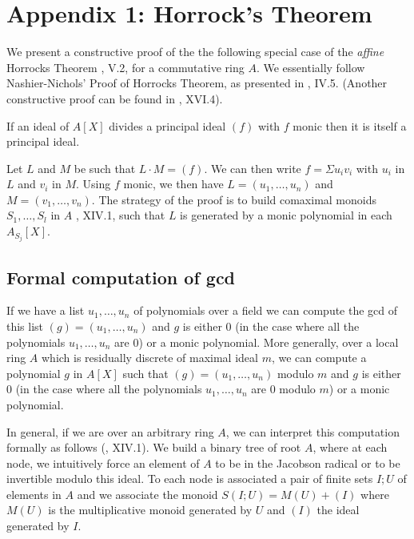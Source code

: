 \section*{Appendix 1: Horrock's Theorem}

We present a constructive proof of the the following special case of the {\em affine}
Horrocks Theorem \cite{Lam}, V.2, for a commutative ring $A$. We
essentially follow Nashier-Nichols' Proof of Horrocks Theorem, as presented in \cite{Lam}, IV.5.
(Another constructive proof can be found in \cite{lombardi-quitte}, XVI.4).

\begin{lemma}\label{Horrocks}
  If an ideal of $A[X]$ divides a principal ideal $(f)$ with $f$ monic then it is itself a principal ideal.
\end{lemma}

Let $L$ and $M$ be such that $L\cdot M = (f)$. We can then write $f = \Sigma u_iv_i$ with $u_i$ in $L$ and
$v_i$ in $M$. Using $f$ monic, we then have $L = (u_1,\dots,u_n)$ and $M = (v_1,\dots,v_n)$.
The strategy of the proof is to build comaximal monoids $S_1,\dots,S_l$ in $A$ \cite{lombardi-quitte},
XIV.1, such that $L$ is generated by a monic polynomial in each $A_{S_j}[X]$.

\subsection{Formal computation of gcd}


 If we have a list $u_1,\dots,u_n$ of polynomials over a field we can compute the gcd of this list
$(g) = (u_1,\dots,u_n)$ and $g$ is either $0$ (in the case where all the polynomials $u_1,\dots,u_n$ are $0$)
 or a monic polynomial. More generally, over a local ring $A$ which is residually discrete of maximal
 ideal $m$, we can compute a polynomial $g$ in $A[X]$ such that 
 $(g) = (u_1,\dots,u_n)$ modulo $m$
 and $g$ is either $0$ (in the case where all the polynomials $u_1,\dots,u_n$ are $0$ modulo $m$)
 or a monic polynomial.

In general, if we are over an arbitrary ring $A$, we can interpret this computation formally as
follows (\cite{lombardi-quitte}, XIV.1). We build a binary tree of root $A$, where at each node,
we intuitively force an element of $A$ to be in the Jacobson radical
or to be invertible modulo this ideal.
To each node is associated a pair of finite sets $I;U$
of elements in $A$ and we associate the monoid $S(I;U) = M(U) + (I)$ where $M(U)$ is the multiplicative
monoid generated by $U$ and $(I)$ the ideal generated by $I$.

